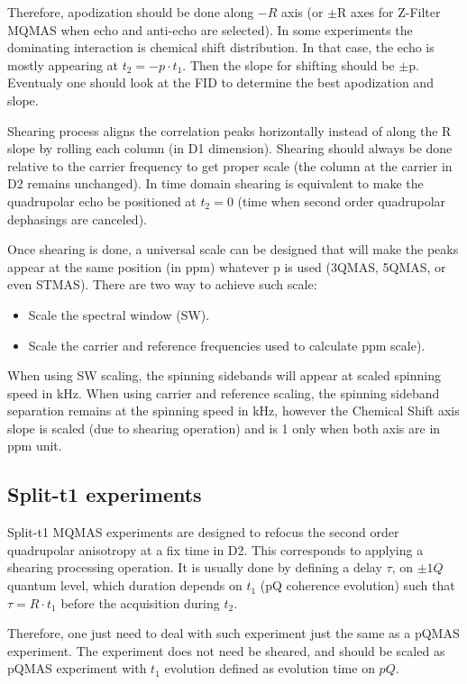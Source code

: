 \documentclass[11pt,a4paper]{article}
\begin{document}
Therefore, apodization should be done along $-R$ axis (or $\pm$R axes for Z-Filter MQMAS when echo and anti-echo are selected).
In some experiments the dominating interaction is chemical shift distribution. In that case, the echo is mostly appearing 
at $t_2 = -p \cdot  t_1$. Then the slope for shifting should be $\pm$p. Eventualy one should look at the FID to determine the best
apodization and slope.


Shearing process aligns the correlation peaks horizontally instead of along the R slope by rolling each column (in D1 dimension). 
Shearing should always be done relative to the carrier frequency to get proper scale (the column at the carrier 
in D2 remains unchanged). In time domain shearing is equivalent to make the quadrupolar echo be positioned
at $t_2=0$ (time when second order quadrupolar dephasings are canceled). 

Once shearing is done, a universal scale can be designed that will make the peaks appear at the same position (in ppm)
whatever p is used (3QMAS, 5QMAS, or even STMAS). There are two way to achieve such scale:
\begin{itemize}
  \item Scale the spectral window (SW).
  \item Scale the carrier and reference frequencies used to calculate ppm scale).
\end{itemize}

When using SW scaling, the spinning sidebands will appear at scaled spinning speed in kHz. When using carrier and 
reference scaling, the spinning sideband separation remains at the spinning speed in kHz, however the Chemical Shift axis 
slope is scaled (due to shearing operation) and is 1 only when both axis are in ppm unit.

\subsection{Split-t1 experiments}
Split-t1 MQMAS experiments are designed to refocus the second order quadrupolar anisotropy at a fix time in D2.
This corresponds to applying a shearing processing operation. It is usually done by defining a delay $\tau$, on $\pm 1Q$ quantum
level, which duration depends on $t_1$ (pQ coherence evolution) such that $\tau = R \cdot t_1$ before the acquisition during $t_2$.

Therefore, one just need to deal with such experiment just the same as a pQMAS experiment. The experiment does not need be sheared, 
and should be scaled as pQMAS experiment with $t_1$ evolution defined as evolution time on $pQ$. 
\end{document}

